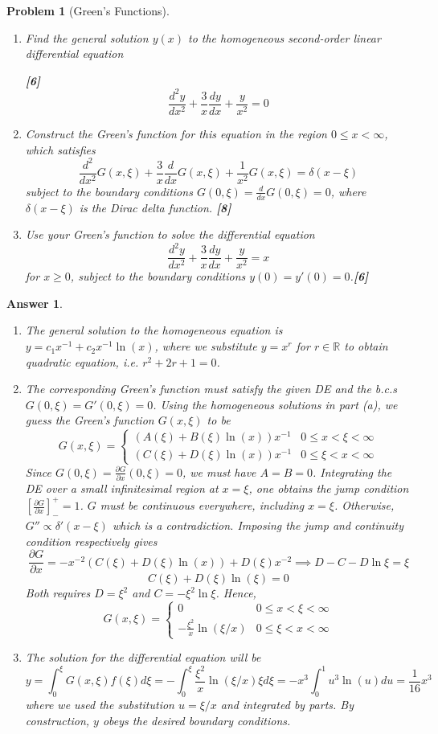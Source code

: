 \documentclass[a4paper]{article}
\newtheorem{ans}{Answer}[section]
\theoremstyle{new}
\newtheorem{qns}{Problem}[section]
\begin{document}
\newpage
\begin{qns}[Green's Functions]\leavevmode
\begin{enumerate}[label=(\alph*)]
\item Find the general solution $y(x)$ to the homogeneous second-order linear differential equation 

\hfill \textbf{[6]}
$$\frac{d^2y}{dx^2}+\frac{3}{x}\frac{dy}{dx}+\frac{y}{x^2}=0$$
\item Construct the Green's function for this equation in the region $0\leq x<\infty$, which satisfies
$$\frac{d^2}{dx^2}G(x,\xi)+\frac{3}{x}\frac{d}{dx}G(x,\xi)+\frac{1}{x^2}G(x,\xi)=\delta(x-\xi)$$
subject to the boundary conditions $G(0,\xi)=\frac{d}{dx}G(0,\xi)=0$, where $\delta(x-\xi)$ is the Dirac delta function. \hfill \textbf{[8]}
\item Use your Green's function to solve the differential equation
$$\frac{d^2y}{dx^2}+\frac{3}{x}\frac{dy}{dx}+\frac{y}{x^2}=x$$
for $x\geq0$, subject to the boundary conditions $y(0)=y'(0)=0$.\hfill \textbf{[6]}
\end{enumerate}
\end{qns}
\begin{ans}\leavevmode
\begin{enumerate}[label=(\alph*)]
\item The general solution to the homogeneous equation is $y=c_1x^{-1}+c_2x^{-1}\ln(x)$, where we substitute $y=x^r$ for $r\in\mathbb{R}$ to obtain quadratic equation, i.e. $r^2+2r+1=0$.
\item The corresponding Green's function must satisfy the given DE and the b.c.s $G(0,\xi)=G'(0,\xi)=0$. Using the homogeneous solutions in part (a), we guess the Green's function $G(x,\xi)$ to be
$$G(x,\xi)=
\left\{
        \begin{array}{ll}
      (A(\xi)+B(\xi)\ln(x))x^{-1}& 0\leq x<\xi<\infty \\
      (C(\xi)+D(\xi)\ln(x))x^{-1} & 0\leq\xi<x<\infty
        \end{array}
    \right.$$
Since $G(0,\xi)=\frac{\partial G}{\partial x}(0,\xi)=0$, we must have $A=B=0$. Integrating the DE over a small infinitesimal region at $x=\xi$, one obtains the jump condition $[\frac{\partial G}{\partial x}]_-^+=1$. $G$ must be continuous everywhere, including $x=\xi$. Otherwise, $G''\propto\delta'(x-\xi)$ which is a contradiction. Imposing the jump and continuity condition respectively gives
$$\frac{\partial G}{\partial x}=-x^{-2}(C(\xi)+D(\xi)\ln(x))+D(\xi)x^{-2}\implies D-C-D\ln\xi=\xi$$
$$C(\xi)+D(\xi)\ln(\xi)=0$$
Both requires $D=\xi^2$ and $C=-\xi^2\ln\xi$. Hence, $$G(x,\xi)=
\left\{
        \begin{array}{ll}
      0& 0\leq x<\xi<\infty \\
      -\frac{\xi^2}{x}\ln(\xi/x) & 0\leq\xi<x<\infty
        \end{array}
    \right.$$
\item The solution for the differential equation will be
$$y=\int_0^\xi G(x,\xi)f(\xi)d\xi=-\int_0^\xi\frac{\xi^2}{x}\ln(\xi/x)\xi d\xi=-x^3\int_0^1u^3\ln(u)du=\frac{1}{16}x^3$$
where we used the substitution $u=\xi/x$ and integrated by parts. By construction, $y$ obeys the desired boundary conditions.
\end{enumerate}
\end{ans}
\end{document}
